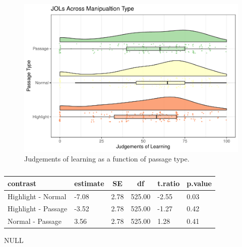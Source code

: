 \documentclass[pdf]{apa6}
\begin{document}
\begin{figure}

{\centering \includegraphics{SF_Paper_files/figure-latex/unnamed-chunk-3-1} 

}

\caption{Judgements of learning as a function of passage type.}\label{fig:unnamed-chunk-3}
\end{figure}

\begin{table}[tbp]
\begin{center}
\begin{threeparttable}
\caption{\label{tab:unnamed-chunk-3}}
\begin{tabular}{llllll}
\toprule
contrast & \multicolumn{1}{c}{estimate} & \multicolumn{1}{c}{SE} & \multicolumn{1}{c}{df} & \multicolumn{1}{c}{t.ratio} & \multicolumn{1}{c}{p.value}\\
\midrule
Highlight - Normal & -7.08 & 2.78 & 525.00 & -2.55 & 0.03\\
Highlight - Passage & -3.52 & 2.78 & 525.00 & -1.27 & 0.42\\
Normal - Passage & 3.56 & 2.78 & 525.00 & 1.28 & 0.41\\
\bottomrule
\end{tabular}
\end{threeparttable}
\end{center}
\end{table}

NULL
\end{document}
